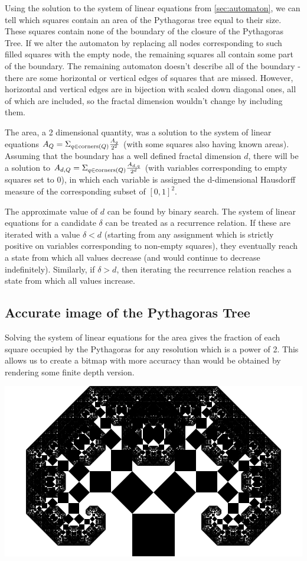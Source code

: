 \documentclass{article}
\begin{document}
Using the solution to the system of linear equations from \ref{sec:automaton}, we can tell which squares contain an area of the Pythagoras tree equal to their size. These squares contain none of the boundary of the closure of the Pythagoras Tree. If we alter the automaton by replacing all nodes corresponding to such filled squares with the empty node, the remaining squares all contain some part of the boundary. The remaining automaton doesn't describe all of the boundary - there are some horizontal or vertical edges of squares that are missed. However, horizontal and vertical edges are in bijection with scaled down diagonal ones, all of which are included, so the fractal dimension wouldn't change by including them.

The area, a 2 dimensional quantity, was a solution to the system of linear equations $A_Q = \Sigma_{q\in\mathrm{corners}(Q)} {A_q\over 2^2}$ (with some squares also having known areas). Assuming that the boundary has a well defined fractal dimension $d$, there will be a solution to $A_{d,Q} = \Sigma_{q\in\mathrm{corners}(Q)} {A_{d,q}\over 2^d}$ (with variables corresponding to empty squares set to 0), in which each variable is assigned the d-dimensional Hausdorff measure of the corresponding subset of $[0,1]^2$.

The approximate value of $d$ can be found by binary search. The system of linear equations for a candidate $\delta$ can be treated as a recurrence relation. If these are iterated with a value $\delta<d$ (starting from any assignment which is strictly positive on variables corresponding to non-empty squares), they eventually reach a state from which all values decrease (and would continue to decrease indefinitely). Similarly, if $\delta>d$, then iterating the recurrence relation reaches a state from which all values increase.

\subsection{Accurate image of the Pythagoras Tree}
Solving the system of linear equations for the area gives the fraction of each square occupied by the Pythagoras for any resolution which is a power of 2. This allows us to create a bitmap with more accuracy than would be obtained by rendering some finite depth version.

\includegraphics[width=\linewidth]{x7.png}
\end{document}
